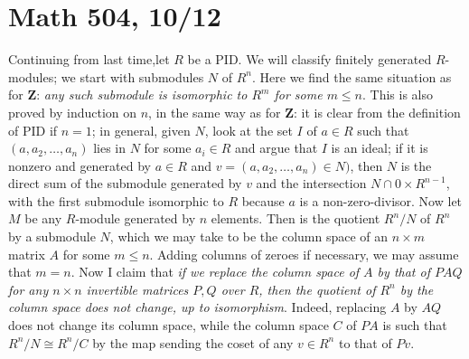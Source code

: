 \documentclass[10pt]{article}
\begin{document}
\section*{Math 504, 10/12}

Continuing from last time,let $R$ be a PID. We will classify finitely
generated $R$-modules; we start with submodules $N$ of $R^n$. Here we
find the same situation as for $\mathbf{Z}$: {\sl any such submodule is
  isomorphic to $R^m$ for some $m\le n$}. This is also proved by
induction on $n$, in the same way as for $\mathbf{Z}$: it is clear from
the definition of PID if $n=1$; in general, given $N$, look at the set
$I$ of $a\in R$ such that $(a,a_2,\ldots,a_n)$ lies in $N$ for some
$a_i\in R$ and argue that $I$ is an ideal; if it is nonzero and
generated by $a\in R$ and $v=(a,a_2,\ldots,a_n)\in N)$, then $N$ is the
direct sum of the submodule generated by $v$ and the intersection $N\cap
0\times R^{n-1}$, with the first submodule isomorphic to $R$ because $a$
is a non-zero-divisor. Now let $M$ be any $R$-module generated by $n$
elements. Then is the quotient $R^n/N$ of $R^n$ by a submodule $N$,
which we may take to be the column space of an $n\times m$ matrix $A$
for some $m\le n$. Adding columns of zeroes if necessary, we may assume
that $m=n$. Now I claim that {\sl if we replace the column space of $A$
  by that of $PAQ$ for any $n\times n$ invertible matrices $P,Q$ over
  $R$, then the quotient of $R^n$ by the column space does not change,
  up to isomorphism}. Indeed, replacing $A$ by $AQ$ does not change its
column space, while the column space $C$ of $PA$ is such that
$R^n/N\cong R^n/C$ by the map sending the coset of any $v\in R^n$ to
that of $Pv$.
\end{document}
